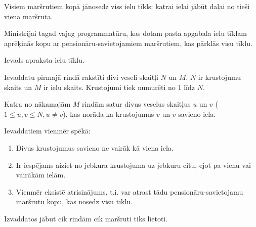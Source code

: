 \documentclass{boi2014-lv}
\begin{document}
		Visiem maršrutiem kopā jānosedz viss ielu tīkls: katrai ielai jābūt daļai no tieši viena maršruta.

    \Task
		
		Ministrijai tagad vajag programmatūru, kas dotam pasta apgabala ielu tīklam aprēķinās kopu ar pensionāru-savietojamiem maršrutiem, kas pārklās visu tīklu.

    \Input

		Ievads apraksta ielu tīklu.
		
		Ievaddatu pirmajā rindā rakstīti divi veseli skaitļi $N$ un $M$. $N$ ir krustojumu skaits un $M$ ir ielu skaits. Krustojumi tiek numurēti no 1 līdz $N$.

		Katra no nākamajām $M$ rindām satur divus veselus skaitļus $u$ un $v$ ($1 \le u, v \le N, u \neq v$), kas norāda ka krustojumus $v$ un $v$ savieno iela.

		Ievaddatiem vienmēr spēkā:
    \begin{enumerate}
        \item Divus krustojumus savieno ne vairāk kā viena iela.
	\item Ir iespējams aiziet no jebkura krustojuma uz jebkuru citu, ejot pa vienu vai vairākām ielām. %
        \item Vienmēr eksistē atrisinājums, t.i. var atrast tādu pensionāru-savietojamu maršrutu kopu, kas nosedz visu tīklu. %
	
    \end{enumerate}

    \Output
		Izvaddatos jābut cik rindām cik maršruti tiks lietoti.
		
\end{document}
